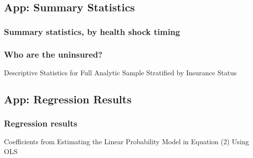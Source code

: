 \documentclass[10pt,compress,xcolor=dvipsnames,aspectratio=169]{beamer}    %
\newcounter{ex}
\newcommand{\1}[1]{\mathrm{1\hspace*{-2.5pt}l}[#1]}	%
\begin{document}
\subsection{App: Summary Statistics}
\begin{frame}
\frametitle{Summary statistics, by health shock timing}\label{frame:sumstats2}

\begin{table}[ht]
	\small\resizebox{0.8\textheight}{!}{
		
	}
\end{table}



\hyperlink{frame:sumstats}{}
\hyperlink{frame:limit}{}
\end{frame}

\begin{frame}
\frametitle{Who are the uninsured?}\label{frame:uninsured}
\begin{table}[ht]
	\caption{Descriptive Statistics for Full Analytic Sample Stratified by Insurance Status}
	\small\resizebox{1.3\textheight}{!}{
		
	}
\end{table}

\hyperlink{frame:sumstats}{}
\hyperlink{frame:vars}{}

\end{frame}



\subsection{App: Regression Results}
\begin{frame}
\frametitle{Regression results} \label{frame:fullreg}
{\scriptsize Coefficients from Estimating the Linear Probability Model in Equation (2) Using OLS} \hyperlink{fig:maincoeffplot}{}

\begin{table}[ht]
	\resizebox{0.8\textheight}{!}{
		
	}
\end{table}


\end{frame}
\end{document}
